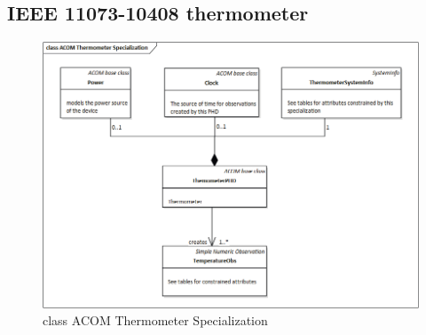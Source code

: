 \documentclass[a4paper]{article}
\begin{document}
    \subsection{IEEE 11073-10408 thermometer}
    \begin{figure}[H]
        \centering
        \includegraphics[width=1\textwidth]{figures/ACOM thermometer specialization class.png}
        \caption{class ACOM Thermometer Specialization}
    \end{figure}
\end{document}
